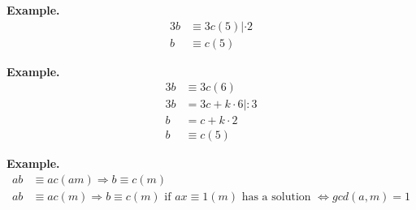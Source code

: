 \textbf{Example.}
\begin{align*}
  3b &\equiv 3c (5) | \cdot 2 \\
  b &\equiv c(5)
\end{align*}

\textbf{Example.}
\begin{align*}
  3b &\equiv 3c (6) \\
  3b &= 3c + k \cdot 6 | :3 \\
  b &= c + k \cdot 2 \\
  b &\equiv c(5)
\end{align*}

\textbf{Example.}
\begin{align*}
  ab &\equiv ac (am) \Rightarrow b \equiv  c (m) \\
  ab &\equiv ac (m) \Rightarrow b \equiv c (m)
    \text{ if } ax \equiv 1 (m) \text{ has a solution } \iff gcd(a,m) = 1
\end{align*}


